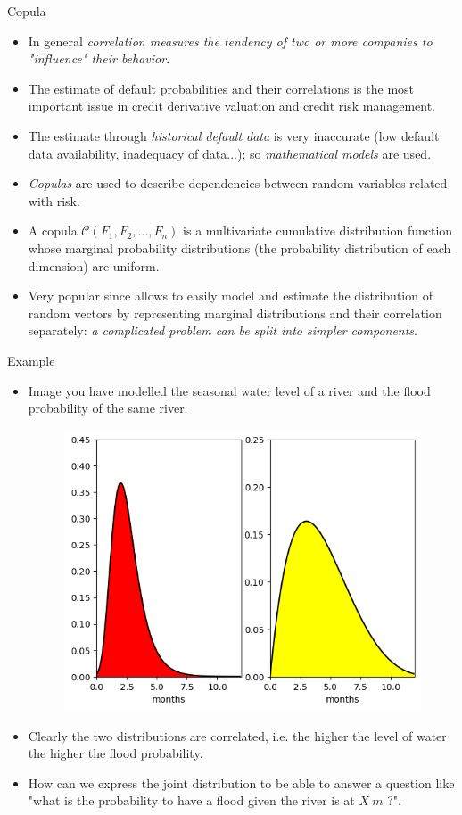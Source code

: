 \documentclass{beamer}
\begin{document}
\begin{frame}{Copula}
  \begin{itemize}
  \item In general \emph{correlation measures the tendency of two or more companies to "influence" their behavior}. 
  \item The estimate of default probabilities and their correlations is the most important issue in credit derivative valuation and credit risk management. 
  \item The estimate through \emph{historical default data} is very inaccurate (low default data availability, inadequacy of data...); so \emph{mathematical models} are used.
  \item \emph{Copulas} are used to describe dependencies between random variables related with risk. 
  \item A copula $\mathcal{C}(F_1, F_2, \ldots, F_n)$ is a multivariate cumulative distribution function whose marginal probability distributions (the probability distribution of each dimension) are uniform. 
  \item Very popular since allows to easily model and estimate the distribution of random vectors by representing marginal distributions and their correlation separately: \emph{a complicated problem can be split into simpler components}.
  \end{itemize}
\end{frame}

\begin{frame}[fragile]{Example}
\begin{itemize}
	\item Image you have modelled the seasonal water level of a river and the flood probability of the same river.
	\begin{figure}[h]
		\begin{center}
		    \includegraphics[width=0.4\linewidth]{floods}
		\end{center}
	\end{figure}
	\item Clearly the two distributions are correlated, i.e. the higher the level of water the higher the flood probability.
	\item How can we express the joint distribution to be able to answer a question like "what is the probability to have a flood given the river is at $X~m$ ?". 
\end{itemize}
\end{frame}
\end{document}
